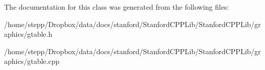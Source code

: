The documentation for this class was generated from the following files\+:\begin{DoxyCompactItemize}
\item 
/home/stepp/\+Dropbox/data/docs/stanford/\+Stanford\+C\+P\+P\+Lib/\+Stanford\+C\+P\+P\+Lib/graphics/gtable.\+h\item 
/home/stepp/\+Dropbox/data/docs/stanford/\+Stanford\+C\+P\+P\+Lib/\+Stanford\+C\+P\+P\+Lib/graphics/gtable.\+cpp\end{DoxyCompactItemize}
